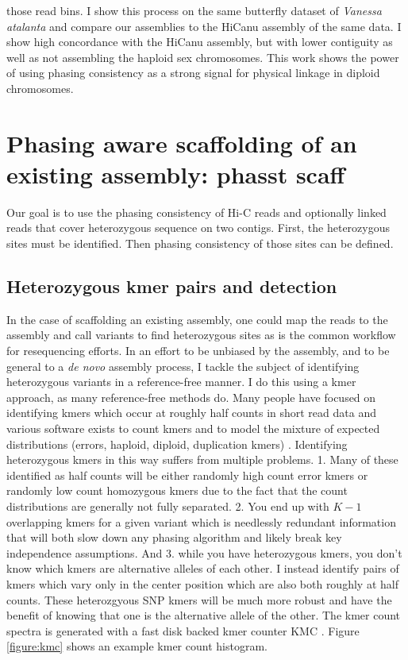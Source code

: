 {those read bins. I show this process on the same butterfly dataset of \textit{Vanessa atalanta} and compare our assemblies to the HiCanu assembly of the same data. I show high concordance with the HiCanu assembly, but with lower contiguity as well as not assembling the haploid sex chromosomes. This work shows the power of using phasing consistency as a strong signal for physical linkage in diploid chromosomes.
}


\section{Phasing aware scaffolding of an existing assembly: phasst scaff}

\par{
Our goal is to use the phasing consistency of Hi-C reads and optionally linked reads that cover heterozygous sequence on two contigs. First, the heterozygous sites must be identified. Then phasing consistency of those sites can be defined.
}

\subsection{Heterozygous kmer pairs and detection}
\par{
In the case of scaffolding an existing assembly, one could map the reads to the assembly and call variants to find heterozygous sites as is the common workflow for resequencing efforts. In an effort to be unbiased by the 
assembly, and to be general to a \textit{de novo} assembly process, I tackle the subject of identifying heterozygous variants in a reference-free manner. I do this using a kmer approach, as many reference-free methods do. 
Many people have focused on identifying kmers which occur at roughly half counts in short read data \cite{KAT} and various software exists to count kmers \cite{jellyfish} 
and to model the mixture of expected distributions (errors, haploid, diploid, duplication kmers) \cite{genomescope}. Identifying heterozygous kmers in this way 
suffers from multiple problems. 1. Many of these identified as half counts will be either randomly high count error kmers or randomly low count 
homozygous kmers due to the fact that the count distributions are generally not fully separated. 2. You end up with $K-1$ overlapping kmers for a given variant which is needlessly redundant information that will both slow down any phasing algorithm and 
likely break key independence assumptions. And 3. while you have heterozygous kmers, you don't know which kmers are alternative alleles of each other. 
I instead identify pairs of kmers which vary only in the center position which are also both roughly at half counts. These heterozgyous SNP kmers 
will be much more robust and have the benefit of knowing that one is the alternative allele of the other. The kmer count spectra is generated with a fast disk backed kmer counter KMC \cite{kmc}\cite{kmc2}\cite{kmc3}. Figure \ref{figure:kmc} shows an example kmer count histogram. 
}

